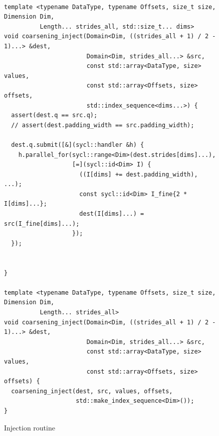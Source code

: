 \documentclass[12pt, a4paper]{article}
\begin{document}
\begin{figure}
\begin{lstlisting}

template <typename DataType, typename Offsets, size_t size, Dimension Dim,
          Length... strides_all, std::size_t... dims>
void coarsening_inject(Domain<Dim, ((strides_all + 1) / 2 - 1)...> &dest,
                       Domain<Dim, strides_all...> &src,
                       const std::array<DataType, size> values,
                       const std::array<Offsets, size> offsets,
                       std::index_sequence<dims...>) {
  assert(dest.q == src.q);
  // assert(dest.padding_width == src.padding_width);

  dest.q.submit([&](sycl::handler &h) {
    h.parallel_for(sycl::range<Dim>(dest.strides[dims]...),
                   [=](sycl::id<Dim> I) {
                     ((I[dims] += dest.padding_width), ...);
                     const sycl::id<Dim> I_fine{2 * I[dims]...};
                     dest(I[dims]...) = src(I_fine[dims]...);
                   });
  });

  
}

template <typename DataType, typename Offsets, size_t size, Dimension Dim,
          Length... strides_all>
void coarsening_inject(Domain<Dim, ((strides_all + 1) / 2 - 1)...> &dest,
                       Domain<Dim, strides_all...> &src,
                       const std::array<DataType, size> values,
                       const std::array<Offsets, size> offsets) {
  coarsening_inject(dest, src, values, offsets,
                    std::make_index_sequence<Dim>());
}

\end{lstlisting}
\caption{Injection routine}
\end{figure}



  
\end{document}
